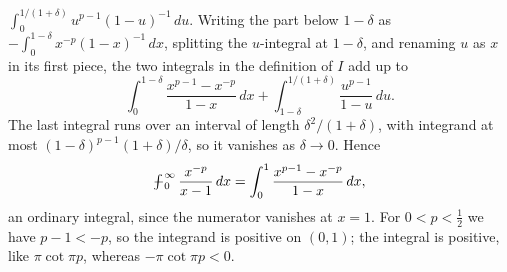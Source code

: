 $\int_0^{1/(1+\delta)}u^{p-1}(1-u)^{-1}\,du$. Writing the part below
$1-\delta$ as $-\int_0^{1-\delta}x^{-p}(1-x)^{-1}\,dx$, splitting the
$u$-integral at $1-\delta$, and renaming $u$ as $x$ in its first piece,
the two integrals in the definition of $I$ add up to
\[
\int_0^{1-\delta}\frac{x^{p-1}-x^{-p}}{1-x}\,dx
+\int_{1-\delta}^{1/(1+\delta)}\frac{u^{p-1}}{1-u}\,du.
\]
The last integral runs over an interval of length $\delta^2/(1+\delta)$,
with integrand at most $(1-\delta)^{p-1}(1+\delta)/\delta$, so it
vanishes as $\delta\to0$. Hence
\[
\PVint_0^\infty\frac{x^{-p}}{x-1}\,dx
=\int_0^1\frac{x^{p-1}-x^{-p}}{1-x}\,dx,
\]
an ordinary integral, since the numerator vanishes at $x=1$. For
$0<p<\frac12$ we have $p-1<-p$, so the integrand is positive on
$(0,1)$; the integral is positive, like $\pi\cot\pi p$, whereas
$-\pi\cot\pi p<0$.

